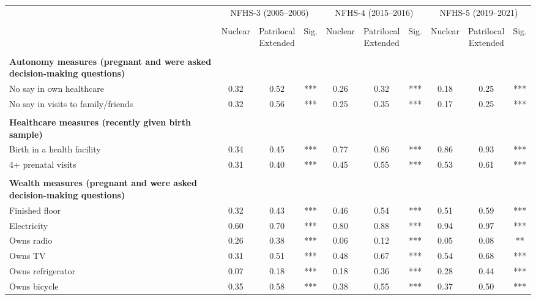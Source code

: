 \begin{tabular}{lccccccccc}
\toprule
 & \multicolumn{3}{c}{NFHS-3 (2005--2006)} & \multicolumn{3}{c}{NFHS-4 (2015--2016)} & \multicolumn{3}{c}{NFHS-5 (2019--2021)} \\\\
\cmidrule(lr){2-4} \cmidrule(lr){5-7} \cmidrule(lr){8-10}
 & Nuclear & \shortstack{Patrilocal\\Extended} & Sig. & Nuclear & \shortstack{Patrilocal\\Extended} & Sig. & Nuclear & \shortstack{Patrilocal\\Extended} & Sig. \\\\
\midrule
\textbf{Autonomy measures (pregnant and were asked decision-making questions)}&&&&&&&&&\\
\hspace*{2em}No say in own healthcare&0.32&0.52&***&0.26&0.32&***&0.18&0.25&***\\
\hspace*{2em}No say in visits to family/friends&0.32&0.56&***&0.25&0.35&***&0.17&0.25&***\\
&&&&&&&&&\\
\textbf{Healthcare measures (recently given birth sample)}&&&&&&&&&\\
\hspace*{2em}Birth in a health facility&0.34&0.45&***&0.77&0.86&***&0.86&0.93&***\\
\hspace*{2em}4+ prenatal visits&0.31&0.40&***&0.45&0.55&***&0.53&0.61&***\\
&&&&&&&&&\\
\textbf{Wealth measures (pregnant and were asked decision-making questions)}&&&&&&&&&\\
\hspace*{2em}Finished floor&0.32&0.43&***&0.46&0.54&***&0.51&0.59&***\\
\hspace*{2em}Electricity&0.60&0.70&***&0.80&0.88&***&0.94&0.97&***\\
\hspace*{2em}Owns radio&0.26&0.38&***&0.06&0.12&***&0.05&0.08&**\\
\hspace*{2em}Owns TV&0.31&0.51&***&0.48&0.67&***&0.54&0.68&***\\
\hspace*{2em}Owns refrigerator&0.07&0.18&***&0.18&0.36&***&0.28&0.44&***\\
\hspace*{2em}Owns bicycle&0.35&0.58&***&0.38&0.55&***&0.37&0.50&***\\

\end{tabular}
